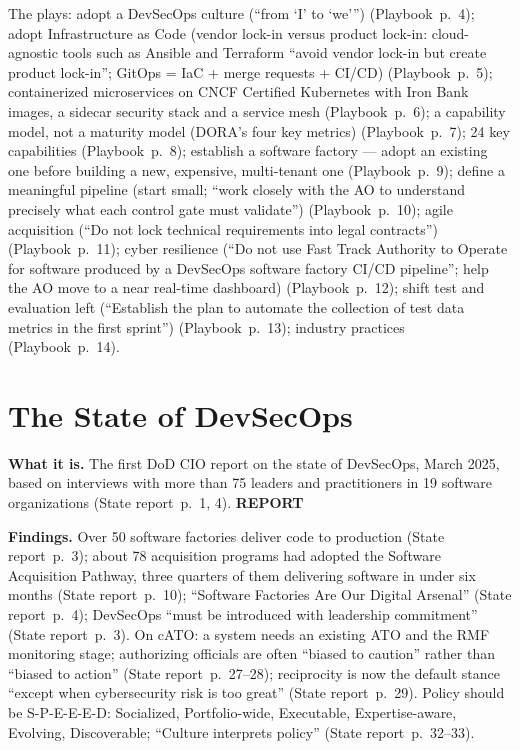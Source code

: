 \documentclass[11pt,letterpaper,twoside,openany]{memoir}
\newcommand{\pg}[2]{{\small(#1~p.~#2)}}          %
\newcommand{\st}[1]{{\sffamily\scriptsize\bfseries #1}}   %
\begin{document}
The plays: adopt a DevSecOps culture (``from `I' to `we'{}'') \pg{Playbook}{4}; adopt Infrastructure as Code (vendor
lock-in versus product lock-in: cloud-agnostic tools such as Ansible and Terraform ``avoid vendor lock-in but create product lock-in''; GitOps =
IaC + merge requests + CI/CD) \pg{Playbook}{5}; containerized microservices on CNCF Certified Kubernetes with Iron Bank
images, a sidecar security stack and a service mesh \pg{Playbook}{6}; a capability model, not a maturity model (DORA's
four key metrics) \pg{Playbook}{7}; 24 key capabilities \pg{Playbook}{8}; establish a software factory --- adopt an
existing one before building a new, expensive, multi-tenant one \pg{Playbook}{9}; define a meaningful pipeline (start
small; ``work closely with the AO to understand precisely what each control gate must validate'') \pg{Playbook}{10};
agile acquisition (``Do not lock technical requirements into legal contracts'') \pg{Playbook}{11}; cyber resilience
(``Do not use Fast Track Authority to Operate for software produced by a DevSecOps software factory CI/CD pipeline'';
help the AO move to a near real-time dashboard) \pg{Playbook}{12}; shift test and evaluation left (``Establish the plan
to automate the collection of test data metrics in the first sprint'') \pg{Playbook}{13}; industry practices
\pg{Playbook}{14}.

\section{The State of DevSecOps}
\textbf{What it is.} The first DoD CIO report on the state of DevSecOps, March 2025, based on interviews with more than
75 leaders and practitioners in 19 software organizations \pg{State report}{1, 4}. \st{REPORT}

\textbf{Findings.} Over 50 software factories deliver code to production \pg{State report}{3}; about 78 acquisition
programs had adopted the Software Acquisition Pathway, three quarters of them delivering software in under six months
\pg{State report}{10}; ``Software Factories Are Our Digital Arsenal'' \pg{State report}{4}; DevSecOps ``must be
introduced with leadership commitment'' \pg{State report}{3}. On cATO: a system needs an existing ATO and the RMF
monitoring stage; authorizing officials are often ``biased to caution'' rather than ``biased to action''
\pg{State report}{27--28}; reciprocity is now the default stance ``except when cybersecurity risk is too great''
\pg{State report}{29}. Policy should be S-P-E-E-E-D: Socialized, Portfolio-wide, Executable, Expertise-aware, Evolving,
Discoverable; ``Culture interprets policy'' \pg{State report}{32--33}.
\end{document}
